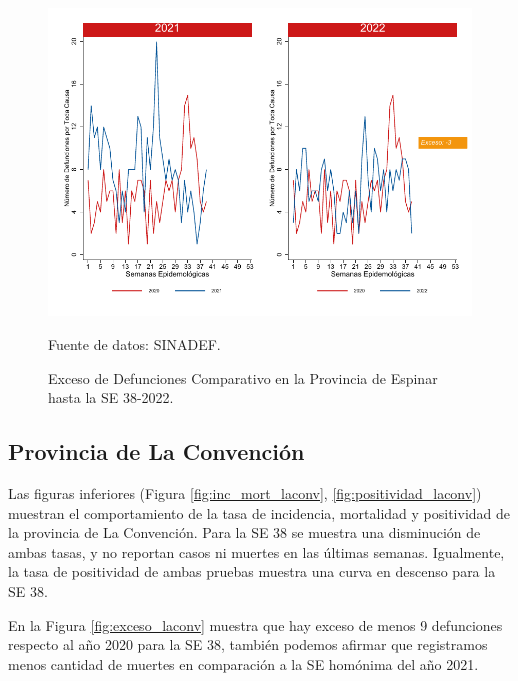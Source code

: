 \documentclass[12pt,a4paper,openany]{book}
\begin{document}
	\begin{figure}[h]
		\caption{Exceso de Defunciones Comparativo en la Provincia de Espinar hasta la SE 38-2022.}\label{fig:exceso_espinar}
		\begin{center}
			\includegraphics[width=0.7\linewidth]{../figuras/exceso_8.pdf}
		\end{center}
		{\footnotesize {Fuente de datos: SINADEF.}}
	\end{figure}
	
	\clearpage
	
	\subsection*{Provincia de La Convención}
	\noindent Las figuras inferiores (Figura \ref{fig:inc_mort_laconv}, \ref{fig:positividad_laconv}) muestran el comportamiento de la tasa de incidencia, mortalidad y positividad de la provincia de La Convención. Para la SE 38 se muestra una disminución de ambas tasas, y no reportan casos ni muertes en las últimas semanas. Igualmente, la tasa de positividad de ambas pruebas muestra una curva en descenso para la SE 38. 
		
	En la Figura \ref{fig:exceso_laconv} muestra que hay exceso de menos 9 defunciones respecto al año 2020 para la SE 38, también podemos afirmar que registramos menos cantidad de muertes en comparación a la SE homónima del año 2021.    
	
\end{document}
